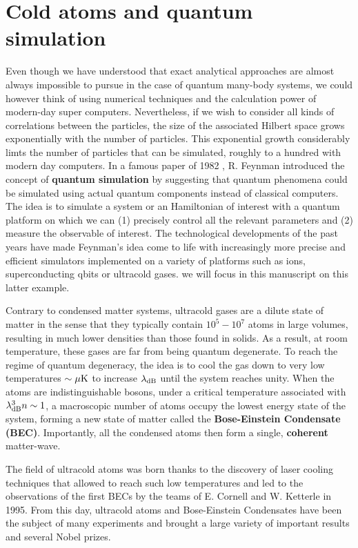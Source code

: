 \section*{Cold atoms and quantum simulation}

Even though we have understood that exact analytical approaches are almost always impossible to pursue in the case of quantum many-body systems, we could however think of using numerical techniques and the calculation power of modern-day super computers. Nevertheless, if we wish to consider all kinds of correlations between the particles, the size of the associated Hilbert space grows exponentially with the number of particles. This exponential growth considerably limts the number of particles that can be simulated, roughly to a hundred with modern day computers. In a famous paper of 1982 \cite{Feynman1982Simulating}, R. Feynman introduced the concept of \textbf{quantum simulation} by suggesting that quantum phenomena could be simulated using actual quantum components instead of classical computers. The idea is to simulate a system or an Hamiltonian of interest with a quantum platform on which we can (1) precisely control all the relevant parameters and (2) measure the observable of interest. The technological developments of the past years have made Feynman's idea come to life with increasingly more precise and efficient simulators implemented on a variety of platforms such as ions, superconducting qbits or ultracold gases. we will focus in this manuscript on this latter example.  

Contrary to condensed matter systems, ultracold gases are a dilute state of matter in the sense that they typically contain $10^5-10^7$ atoms in large volumes, resulting in much lower densities than those found in solids. As a result, at room temperature, these gases are far from being quantum degenerate. To reach the regime of quantum degeneracy, the idea is to cool the gas down to very low temperatures $\sim \mu \rm{K}$ to increase $\lambda_{\rm{dB}}$ until the system reaches unity. When the atoms are indistinguishable  bosons, under a critical temperature associated with $\lambda_{\rm{dB}}^3 n \sim 1$, a macroscopic number of atoms occupy the lowest energy state of the system, forming a new state of matter called the \textbf{Bose-Einstein Condensate (BEC)}. Importantly, all the condensed atoms then form a single, \textbf{coherent} matter-wave. 

The field of ultracold atoms was born thanks to the discovery of laser cooling techniques \cite{chu1985three,dalibard1989laser,phillips1982laser} that allowed to reach such low temperatures and led to the observations of the first BECs by the teams of E. Cornell \cite{anderson1995observation} and W. Ketterle \cite{davis1995bose} in 1995. From this day, ultracold atoms and Bose-Einstein Condensates have been the subject of many experiments and brought a large variety of important results and several Nobel prizes.

